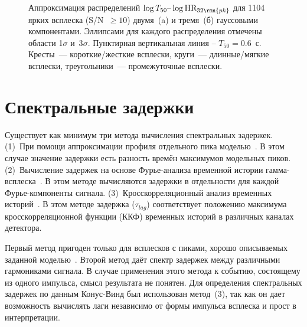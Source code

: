 \begin{figure}[h]
  \begin{minipage}[h]{0.5\textwidth}
  \end{minipage}
  \hfill
  \begin{minipage}[h]{0.5\textwidth}
  \end{minipage}
  \caption{Аппроксимация распределений $\log T_{50}\textrm{--}\log \mbox{HR}_{32\rmn{pk}}$ 
  для 1104 ярких всплеска (S/N~$\geq 10$) двумя~(a) и тремя~(б) гауссовыми компонентами. 
  Эллипсами для каждого распределения отмечены области 1$\sigma$ и~3$\sigma$. 
  Пунктирная вертикальная линия -- $T_{50} = 0.6$~с. Кресты~--- короткие/жесткие всплески, 
  круги~--- длинные/мягкие всплески, треугольники~--- промежуточные всплески.}
  \label{img:HRpkvsT50}  
\end{figure}

\clearpage

\section{Спектральные задержки}\label{sec:Lags}
Существует как минимум три метода вычисления спектральных задержек. 
(1)~При помощи аппроксимации  профиля отдельного пика моделью~\citep{Norris_2005, Hakkila_2008}. 
В этом случае значение задержки есть разность времён максимумов модельных пиков. 
(2)~Вычисление задержек на основе Фурье-анализа временной истории гамма-всплеска~\citep{Li_2004}. 
В этом методе вычисляются задержки в отдельности для каждой Фурье-компоненты сигнала. 
(3)~Кросскорреляционный анализ временных историй~\citep{Band_1997, Norris_2000}. 
В этом методе задержка ($\tau_{lag}$) соответствует положению максимума кросскорреляционной 
функции (ККФ) временных историй в различных каналах детектора.

Первый метод пригоден только для всплесков с пиками, хорошо описываемых 
заданной моделью~\citep[формула (1) в][]{Norris_2005}. Второй метод даёт спектр 
задержек между различными гармониками сигнала. В случае применения этого метода 
к событию, состоящему из одного импульса, смысл результата не понятен. 
Для определения спектральных задержек по данным Конус-Винд был использован метод~(3), 
так как он дает возможность вычислять лаги независимо от формы импульса всплеска 
и прост в интерпретации.

